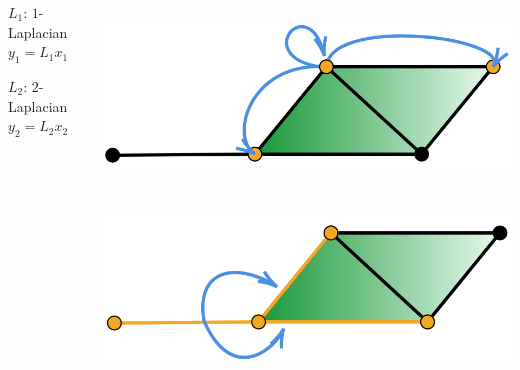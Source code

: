 \documentclass[landscape,a0paper,blockverticalspace = 5mm]{tikzposter}
\begin{document}
\begin{columns}
{{\begin{center}
\begin{minipage}{0.2\linewidth}
      \end{minipage}\hspace{4.5cm}
      \begin{minipage}{0.2\linewidth}
         \begin{center}
		  $L_1$: $1$-Laplacian\\
		$y_1=L_1x_1$
	\end{center}
      \end{minipage} \hspace{4.5cm}
	\begin{minipage}{0.2\linewidth}
         \begin{center}
		 $L_2$: $2$-Laplacian\\
		$y_2=L_2x_2$
	\end{center}
      \end{minipage} 
      
      \end{center}
      
\begin{center}
			
		 \begin{minipage}{0.2\linewidth}
		 \begin{center}
		
          \includegraphics[height=4.8cm]{figures/glap0.png}

          \vspace{1.2cm}
        
          \end{center}
      \end{minipage} \hspace{3.6cm}
      \begin{minipage}{0.2\linewidth}
      \begin{center}
     	\vspace{1.5cm}
          \includegraphics[height=4.58cm]{figures/glap1.png}
          

\end{center}
\end{minipage}
\end{center}}}
\end{columns}
\end{document}
